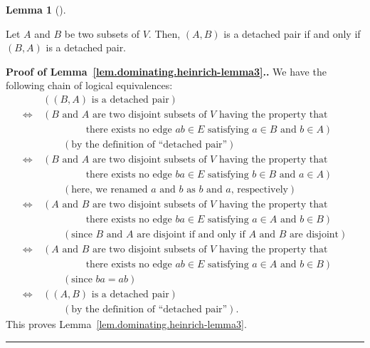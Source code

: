 \documentclass[numbers=enddot,12pt,final,onecolumn,notitlepage]{scrartcl}%
\theoremstyle{definition}
\newtheorem{lem}[theo]{Lemma}
\newenvironment{lemma}[1][]
{\begin{lem}[#1]\begin{leftbar}}
{\end{leftbar}\end{lem}}
\newenvironment{proof}[1][Proof]{\noindent\textbf{#1.} }{\ \rule{0.5em}{0.5em}}
\newcommand{\tup}[1]{\left( #1 \right)}
\begin{document}
\begin{lemma} \label{lem.dominating.heinrich-lemma3}
Let $A$ and $B$ be two subsets of $V$. Then, $\tup{A, B}$ is a
detached pair if and only if $\tup{B, A}$ is a detached pair.
\end{lemma}

\begin{proof}[Proof of Lemma~\ref{lem.dominating.heinrich-lemma3}.]
We have the following chain of logical equivalences:
\begin{align*}
& \left( \tup{B, A} \text{ is a detached pair} \right) \\
\Longleftrightarrow \ 
& \left( B \text{ and } A \text{ are two disjoint subsets of } V
     \text{ having the property that } \right. \\
& \qquad \qquad \left. \text{ there exists no edge } ab \in E
     \text{ satisfying } a \in B \text{ and } b \in A \right) \\
& \qquad \left( \text{by the definition of ``detached pair''} \right)
\\
\Longleftrightarrow \ 
& \left( B \text{ and } A \text{ are two disjoint subsets of } V
     \text{ having the property that } \right. \\
& \qquad \qquad \left. \text{ there exists no edge } ba \in E
     \text{ satisfying } b \in B \text{ and } a \in A \right) \\
& \qquad \left( \text{here, we renamed } a \text{ and } b \text{ as }
            b \text{ and } a\text{, respectively} \right)
\\
\Longleftrightarrow \ 
& \left( A \text{ and } B \text{ are two disjoint subsets of } V
     \text{ having the property that } \right. \\
& \qquad \qquad \left. \text{ there exists no edge } ba \in E
     \text{ satisfying } a \in A \text{ and } b \in B \right) \\
& \qquad \left( \text{since } B \text{ and } A
            \text{ are disjoint if and only if }
            A \text{ and } B \text{ are disjoint} \right)
\\
\Longleftrightarrow \ 
& \left( A \text{ and } B \text{ are two disjoint subsets of } V
     \text{ having the property that } \right. \\
& \qquad \qquad \left. \text{ there exists no edge } ab \in E
     \text{ satisfying } a \in A \text{ and } b \in B \right) \\
& \qquad \left( \text{since } ba = ab \right)
\\
\Longleftrightarrow \ 
& \left( \tup{A, B} \text{ is a detached pair} \right) \\
& \qquad \left( \text{by the definition of ``detached pair''} \right)
.
\end{align*}
This proves Lemma~\ref{lem.dominating.heinrich-lemma3}.
\end{proof}
\end{document}
